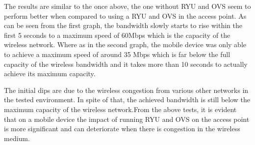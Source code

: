 The results are similar to the once above, the one without RYU and OVS seem to perform better when compared to using a RYU and OVS in the access point. As can be seen from the first graph, the bandwidth slowly starts to rise within the first 5 seconds to a maximum speed of 60Mbps which is the capacity of the wireless network. Where as in the second graph, the mobile device was only able to achieve a maximum speed of around 35 Mbps which is far below the full capacity of the wireless bandwidth and it takes more than 10 seconds to actually achieve its maximum capacity.

The initial dips are due to the wireless congestion from various other networks in the tested environment. In spite of that, the achieved bandwidth is still below the maximum capacity of the wireless network.From the above tests, it is evident that on a mobile device the impact of running RYU and OVS on the access point is more significant and can deteriorate when there is congestion in the wireless medium.


